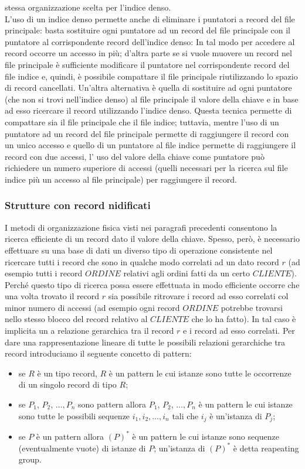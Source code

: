 stessa organizzazione scelta per l'indice denso.\\
L'uso di un indice denso permette anche di eliminare i puntatori a record del file principale: basta
sostituire ogni puntatore ad un record del file principale con il puntatore al corrispondente record
dell'indice denso: In tal modo per accedere al record occorre un accesso in più; d'altra parte se si
vuole muovere un record nel file principale è sufficiente modificare il puntatore nel corrispondente
record del file indice e, quindi, è possibile compattare il file principale riutilizzando lo spazio di
record cancellati. Un'altra alternativa è quella di sostituire ad ogni puntatore (che non si trovi
nell'indice denso) al file principale il valore della chiave e in base ad esso ricercare il record
utilizzando l'indice denso. Questa tecnica permette di compattare sia il file principale che il file
indice; tuttavia, mentre l'uso di un puntatore ad un record del file principale permette di raggiungere
il record con un unico accesso e quello di un puntatore al file indice permette di raggiungere il
record con due accessi, l' uso del valore della chiave come puntatore può richiedere un numero
superiore di accessi (quelli necessari per la ricerca sul file indice più un accesso al file principale)
per raggiungere il record.

\subsubsection{Strutture con record nidificati}
I metodi di organizzazione fisica visti nei paragrafi precedenti consentono la ricerca efficiente di un
record dato il valore della chiave. Spesso, però, è necessario effettuare su una base di dati un
diverso tipo di operazione consistente nel ricercare tutti i record che sono in qualche modo correlati
ad un dato record $r$ (ad esempio tutti i record $ORDINE$ relativi agli ordini fatti da un certo
$CLIENTE$). Perché questo tipo di ricerca possa essere effettuata in modo efficiente occorre che una
volta trovato il record $r$ sia possibile ritrovare i record ad esso correlati col minor numero di accessi
(ad esempio ogni record $ORDINE$ potrebbe trovarsi nello stesso blocco del record relativo al
$CLIENTE$ che lo ha fatto). In tal caso è implicita un a relazione gerarchica tra il record $r$ e i record
ad esso correlati. Per dare una rappresentazione lineare di tutte le possibili relazioni gerarchiche tra
record introduciamo il seguente concetto di pattern:
\begin{itemize}
 \item se $R$ è un tipo record, $R$ è un pattern le cui istanze sono tutte le occorrenze di un singolo record di
tipo $R$;
 \item se $P_1$, $P_2$, $\ldots, P_n$ sono pattern allora $P_1$, $P_2$, $\ldots, P_n$ è un pattern le cui istanze
 sono tutte le possibili sequenze $i_1, i_2, \ldots, i_n$ tali che $i_j$ è un'istanza di $P_j$;
 \item se $P$ è un pattern allora $(P)^*$ è un pattern le cui istanze sono sequenze (eventualmente vuote) di
istanze di $P$; un'istanza di $(P)^*$ è detta reapeating group.
\end{itemize}

